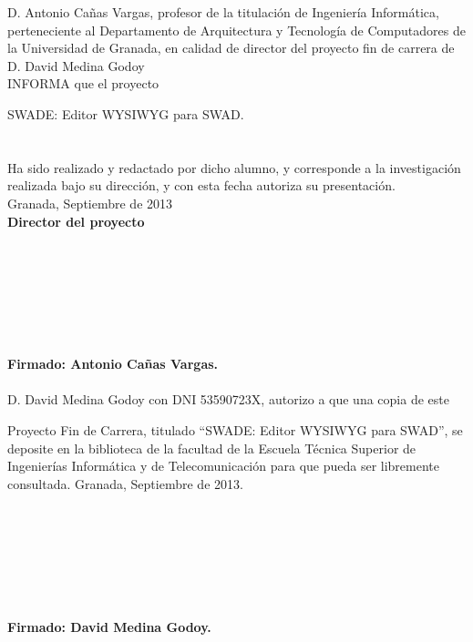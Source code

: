 D. Antonio Cañas Vargas, profesor de la titulación de Ingeniería Informática, perteneciente al Departamento de Arquitectura y Tecnología de Computadores de la Universidad de Granada, en calidad de director del proyecto fin de carrera de D. David Medina Godoy
\\
INFORMA que el proyecto

SWADE: Editor WYSIWYG para SWAD.
\\
\\
\\
Ha sido realizado y redactado por dicho alumno, y corresponde a la investigación realizada
bajo su dirección, y con esta fecha autoriza su presentación.
\\
Granada, Septiembre de 2013\\
\textbf{Director del proyecto}
\\
\\
\\
\\
\\
\\
\\
\\
\textbf{Firmado: Antonio Cañas Vargas.}\\
\\
D. David Medina Godoy con DNI 53590723X, autorizo a que una copia de este

Proyecto Fin de Carrera, titulado ``SWADE: Editor WYSIWYG para SWAD'', se deposite en la biblioteca de la facultad de la Escuela Técnica Superior de Ingenierías Informática y de Telecomunicación para que pueda ser libremente consultada.
{\centering Granada, Septiembre de 2013.}
\\
\\
\\
\\
\\
\\
\\
\\
{\centering\textbf{Firmado: David Medina Godoy.}}

